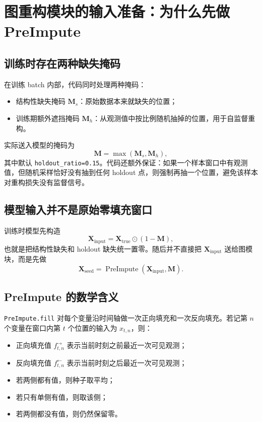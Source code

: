 \documentclass[UTF8]{ctexart}
\begin{document}
\section{图重构模块的输入准备：为什么先做 PreImpute}

\subsection{训练时存在两种缺失掩码}

在训练 batch 内部，代码同时处理两种掩码：
\begin{itemize}
    \item 结构性缺失掩码 \(\bm{M}_s\)：原始数据本来就缺失的位置；
    \item 训练期额外遮挡掩码 \(\bm{M}_h\)：从观测值中按比例随机抽掉的位置，用于自监督重构。
\end{itemize}

实际送入模型的掩码为
\begin{equation}
    \bm{M} = \max(\bm{M}_s, \bm{M}_h),
\end{equation}
其中默认 \verb|holdout_ratio=0.15|。代码还额外保证：如果一个样本窗口中有观测值，但随机采样恰好没有抽到任何 holdout 点，则强制再抽一个位置，避免该样本对重构损失没有监督信号。

\subsection{模型输入并不是原始零填充窗口}

训练时模型先构造
\begin{equation}
    \bm{X}_{\text{input}} = \bm{X}_{\text{true}} \odot (1-\bm{M}),
\end{equation}
也就是把结构性缺失和 holdout 缺失统一置零。随后并不直接把 \(\bm{X}_{\text{input}}\) 送给图模块，而是先做
\begin{equation}
    \bm{X}_{\text{seed}} = \operatorname{PreImpute}(\bm{X}_{\text{input}}, \bm{M}).
\end{equation}

\subsection{PreImpute 的数学含义}

\verb|PreImpute.fill| 对每个变量沿时间轴做一次正向填充和一次反向填充。若记第 \(n\) 个变量在窗口内第 \(t\) 个位置的输入为 \(x_{t,n}\)，则：
\begin{itemize}
    \item 正向填充值 \(f^{\rightarrow}_{t,n}\) 表示当前时刻之前最近一次可见观测；
    \item 反向填充值 \(f^{\leftarrow}_{t,n}\) 表示当前时刻之后最近一次可见观测；
    \item 若两侧都有值，则种子取平均；
    \item 若只有单侧有值，则取该侧；
    \item 若两侧都没有值，则仍然保留零。
\end{itemize}
\end{document}
